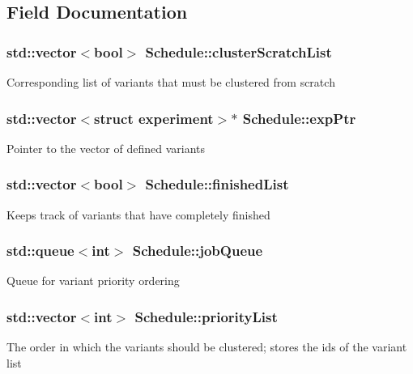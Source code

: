 \subsection{Field Documentation}
\hypertarget{classSchedule_a2077242582962c5100fd8d5b086398cb}{
\subsubsection[{cluster\-Scratch\-List}]{\setlength{\rightskip}{0pt plus 5cm}std\-::vector$<$bool$>$ Schedule\-::cluster\-Scratch\-List\hspace{0.3cm}{\ttfamily [private]}}}\label{classSchedule_a2077242582962c5100fd8d5b086398cb}
Corresponding list of variants that must be clustered from scratch \hypertarget{classSchedule_a6be64e3a9e572d346e11481b49d55b7f}{
\subsubsection[{exp\-Ptr}]{\setlength{\rightskip}{0pt plus 5cm}std\-::vector$<$struct {\bf experiment}$>$$\ast$ Schedule\-::exp\-Ptr}}\label{classSchedule_a6be64e3a9e572d346e11481b49d55b7f}
Pointer to the vector of defined variants \hypertarget{classSchedule_a0e3d2c52318e5c7060c9fa9ea4e9956b}{
\subsubsection[{finished\-List}]{\setlength{\rightskip}{0pt plus 5cm}std\-::vector$<$bool$>$ Schedule\-::finished\-List}}\label{classSchedule_a0e3d2c52318e5c7060c9fa9ea4e9956b}
Keeps track of variants that have completely finished \hypertarget{classSchedule_a5ee0c3a418d3d356c972f09ba4bd1513}{
\subsubsection[{job\-Queue}]{\setlength{\rightskip}{0pt plus 5cm}std\-::queue$<$int$>$ Schedule\-::job\-Queue\hspace{0.3cm}{\ttfamily [private]}}}\label{classSchedule_a5ee0c3a418d3d356c972f09ba4bd1513}
Queue for variant priority ordering \hypertarget{classSchedule_a3bb97864bd4c176f2c55180671abd0a5}{
\subsubsection[{priority\-List}]{\setlength{\rightskip}{0pt plus 5cm}std\-::vector$<$int$>$ Schedule\-::priority\-List\hspace{0.3cm}{\ttfamily [private]}}}\label{classSchedule_a3bb97864bd4c176f2c55180671abd0a5}
The order in which the variants should be clustered; stores the ids of the variant list 

